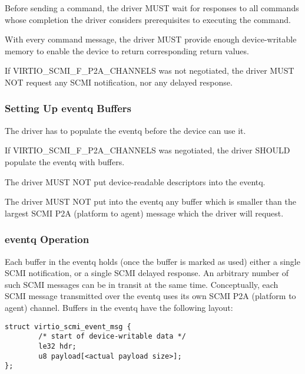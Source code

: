 Before sending a command, the driver MUST wait for responses to all
commands whose completion the driver considers prerequisites to
executing the command.

With every command message, the driver MUST provide enough
device-writable memory to enable the device to return corresponding
return values.

If VIRTIO_SCMI_F_P2A_CHANNELS was not negotiated, the driver MUST NOT
request any SCMI notification, nor any delayed response.

\subsubsection{Setting Up eventq Buffers}

The driver has to populate the eventq before the device can use it.


If VIRTIO_SCMI_F_P2A_CHANNELS was negotiated, the driver SHOULD populate
the eventq with buffers.

The driver MUST NOT put device-readable descriptors into the eventq.

The driver MUST NOT put into the eventq any buffer which is smaller than
the largest SCMI P2A (platform to agent) message which the driver will
request.

\subsubsection{eventq Operation}

Each buffer in the eventq holds (once the buffer is marked as used)
either a single SCMI notification, or a single SCMI delayed response. An
arbitrary number of such SCMI messages can be in transit at the same
time. Conceptually, each SCMI message transmitted over the eventq uses
its own SCMI P2A (platform to agent) channel. Buffers in the eventq have
the following layout:

\begin{lstlisting}
struct virtio_scmi_event_msg {
        /* start of device-writable data */
        le32 hdr;
        u8 payload[<actual payload size>];
};
\end{lstlisting}


